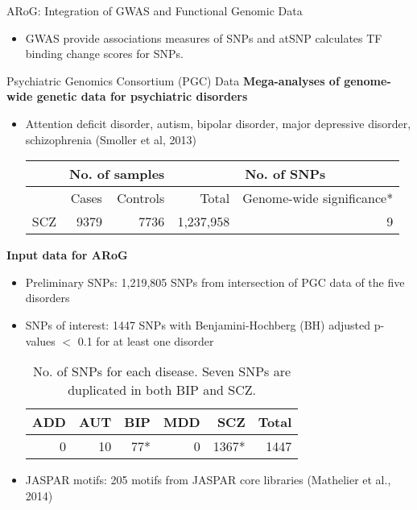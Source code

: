 \documentclass[final]{beamer}
\newcommand{\bi}{\begin{itemize}}
\newcommand{\ei}{\end{itemize}}
\begin{document}
\begin{frame}{}
\begin{columns}[t]
\begin{column}{1\linewidth}
\begin{columns}
\begin{column}{.38\textwidth}
\begin{block}{ARoG: Integration of GWAS and Functional Genomic Data}
\bi
\item GWAS provide associations measures of SNPs and atSNP calculates TF binding change scores for SNPs.
\ei

\end{block}

        \begin{block}{Psychiatric Genomics Consortium (PGC) Data} %
                           {\color{orange!100} \textbf{Mega-analyses of genome-wide genetic data for psychiatric disorders}} %
                            \centering
\bi
\item Attention deficit disorder, autism, bipolar disorder, major depressive disorder, schizophrenia (Smoller et al, 2013)
\begin{table}
{\small
 \begin{tabular}{l|rr|rr}
 \hline
 &  \multicolumn{2}{c|}{No. of samples} & \multicolumn{2}{c}{No. of SNPs}\\
 \hline
 &Cases &  Controls & Total & {\color{red} Genome-wide significance*}\\
 \hline
SCZ & 9379 & 7736& 1,237,958&9\\
 \hline
\end{tabular}
}
\end{table}
\ei
 
 {\color{orange!100} \textbf{ {\color{orange!100} \textbf{Input data for ARoG}}}}
\centering
\bi
\item Preliminary SNPs: 1,219,805 SNPs from intersection of PGC data of the five disorders
\item SNPs of interest: 1447 SNPs with Benjamini-Hochberg (BH) adjusted p-values $<$ 0.1 for at least one disorder
\begin{table}
\centering
{\small
 \begin{tabular}{rrrrrr}
 \hline
 ADD &  AUT & BIP & MDD &SCZ & Total \\
 \hline
 0 & 10& 77* & 0 &1367* & 1447\\
 \hline
\end{tabular}
\caption{No. of SNPs for each disease. Seven SNPs are duplicated in both BIP and SCZ.}
}
\end{table}
\item JASPAR motifs: 205 motifs from JASPAR core libraries (Mathelier et al., 2014)
\ei

 


\end{block}
\end{column}
\end{columns}
\end{column}
\end{columns}
\end{frame}
\end{document}
